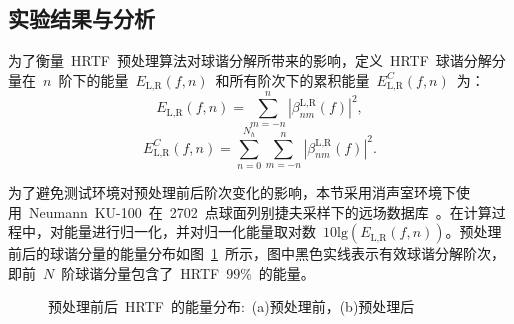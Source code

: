\newpage
\subsection{实验结果与分析}\label{sec.Pre_result}

为了衡量~HRTF~预处理算法对球谐分解所带来的影响，定义~HRTF~球谐分解分量在~$n$~阶下的能量~$E_{\text{L,R}}(f,n)$~和所有阶次下的累积能量~$E_{\text{L,R}}^{C}(f,n)$~为：
\begin{equation}
E_{\text{L,R}}(f,n) = \sum_{m=-n}^{n} | \beta_{nm}^{\text{L,R}}(f) |^{2},
\end{equation}
\begin{equation}
E_{\text{L,R}}^{C}(f,n) = \sum_{n=0}^{N_{h}} \sum_{m=-n}^{n} | \beta_{nm}^{\text{L,R}}(f) |^{2}.
\end{equation}

为了避免测试环境对预处理前后阶次变化的影响，本节采用消声室环境下使用~Neumann~KU-100~在~2702~点球面列别捷夫采样下的远场数据库~。在计算过程中，对能量进行归一化，并对归一化能量取对数~$10\text{lg}\left( E_{\text{L,R}}(f,n)\right)$。预处理前后的球谐分量的能量分布如图~\ref{fig:pre_after}~所示，图中黑色实线表示有效球谐分解阶次，即前~$N$~阶球谐分量包含了~HRTF~$99\%$~的能量。

\begin{figure}[H]
\centering
{}
\hfill
{}
\caption{预处理前后~HRTF~的能量分布:~(a)预处理前，(b)预处理后}
\label{fig:pre_after}
\end{figure}


